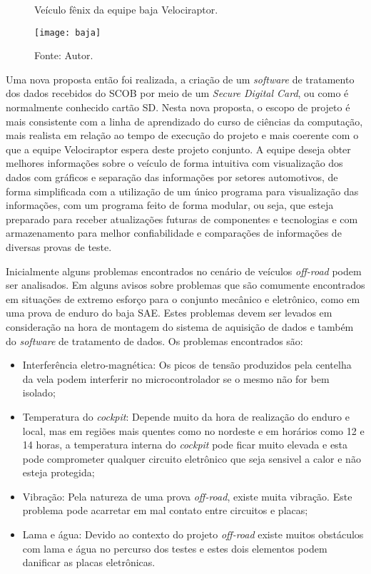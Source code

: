 \begin{figure}[!htb]
	\centering
		\caption{Veículo fênix da equipe baja Velociraptor.}
		\texttt{[image: baja]} 
		\caption*{Fonte: Autor.}
		\label{fig:baja}
\end{figure} 

Uma nova proposta então foi realizada, a criação de um \textit{software} de tratamento dos dados recebidos do SCOB por meio de um \textit{Secure Digital Card}, ou como é normalmente conhecido cartão SD. Nesta nova proposta, o escopo de projeto é mais consistente com a linha de aprendizado do curso de ciências da computação, mais realista em relação ao tempo de execução do projeto e mais coerente com o que a equipe Velociraptor espera deste projeto conjunto. A equipe deseja obter melhores informações sobre o veículo de forma intuitiva com visualização dos dados com gráficos e separação das informações por setores automotivos, de forma simplificada com a utilização de um único programa para visualização das informações, com um programa feito de forma modular, ou seja, que esteja preparado para receber atualizações futuras de componentes e tecnologias e com armazenamento para melhor confiabilidade e comparações de informações de diversas provas de teste.   

Inicialmente alguns problemas encontrados no cenário de veículos \textit{off-road} podem ser analisados. Em  alguns avisos sobre problemas que são comumente encontrados em situações de extremo esforço para o conjunto mecânico e eletrônico, como em uma prova de enduro do baja SAE. Estes problemas devem ser levados em consideração na hora de montagem do sistema de aquisição de dados e também do \textit{software} de tratamento de dados. Os problemas encontrados são:

\begin{itemize}
	\item  Interferência eletro-magnética: Os picos de tensão produzidos pela centelha da vela podem interferir no microcontrolador se o mesmo não for bem isolado; 
	\item Temperatura do \textit{cockpit}: Depende muito da hora de realização do enduro e local, mas em regiões mais quentes como no nordeste e em horários como 12 e 14 horas, a temperatura interna do \textit{cockpit} pode ficar muito elevada e esta pode comprometer qualquer circuito eletrônico que seja sensivel a calor e não esteja protegida; 
	\item Vibração: Pela natureza de uma prova \textit{off-road}, existe muita vibração. Este problema pode acarretar em mal contato entre circuitos e placas;
	\item Lama e água: Devido ao contexto do projeto \textit{off-road} existe muitos obstáculos com lama e água no percurso dos testes e estes dois elementos podem danificar as placas eletrônicas.
\end{itemize}

